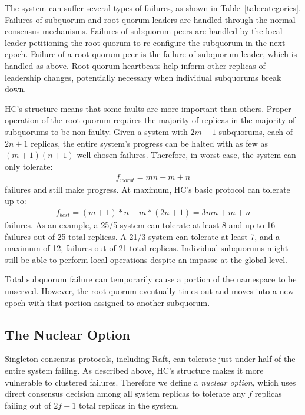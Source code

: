 \documentclass[10pt,conference]{IEEEtran}
\newcommand{\sub}{subquorum\xspace}
\newcommand{\subs}{subquorums\xspace}
\newcommand{\roo}{root quorum\xspace}
\newcommand{\Roo}{Root quorum\xspace}
\begin{document}
The system can suffer several types of failures, as shown in
Table~\ref{tab:categories}.
Failures of \sub and \roo leaders are handled through the normal consensus
mechanisms.
Failures of \sub peers are handled by the local leader petitioning the \roo to
re-configure the \sub in the next epoch.
Failure of a \roo peer is the failure of \sub leader, which is handled as
above.
\Roo heartbeats help inform other replicas of leadership changes, potentially
necessary when individual \subs break down.

HC's structure means that some faults are more important than others.
Proper operation of the \roo requires the majority of replicas in the majority of \subs to
be non-faulty.
Given a system with $2m+1$ \subs, each of $2n+1$ replicas, the entire
system's progress can be halted with as few as $(m+1)(n+1)$ well-chosen
failures.
Therefore, in worst case, the system can only tolerate:
\begin{align*}
f_{worst}=mn+m+n
\end{align*}
failures and still make progress.
At maximum, HC's basic protocol can tolerate up to:
\begin{align*}
f_{best} = (m+1)*n + m*(2n+1) = 3mn+m+n
\end{align*}
failures.
As an example, a 25/5 system can tolerate at least 8 and
up to 16 failures out of 25 total replicas.
A 21/3 system can tolerate at least 7, and a maximum of 12,
failures out of 21 total replicas.
Individual \subs might
still be able to perform local operations despite an impasse at the global level.

Total \sub failure can temporarily cause a portion of the namespace to be unserved. However, the \roo
eventually times out and moves into a new epoch with that portion assigned to another
\sub.

\subsection{The Nuclear Option}
\label{section:nuclear}

Singleton consensus protocols, including Raft, can tolerate just under half of the entire system
failing.
As described above, HC's structure makes it more vulnerable to clustered failures.
Therefore we define a \emph{nuclear option}, which uses direct consensus
decision among all system replicas to tolerate any $f$ replicas
failing out of $2f+1$ total replicas in the system.
\end{document}
